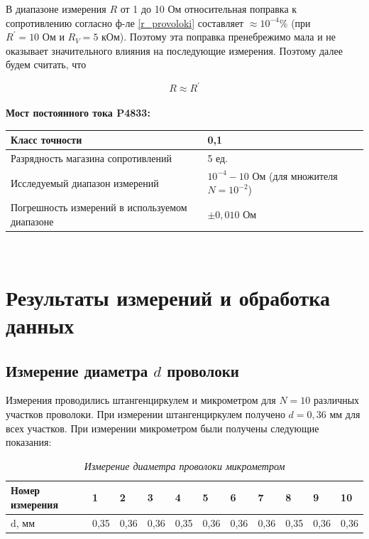\documentclass[a4paper,12pt]{article} %
\begin{document}
В диапазоне измерения $R$ от 1 до 10 Ом относительная поправка 
к сопротивлению согласно ф-ле \eqref{r_provoloki} составляет $\approx 10^{-4} \% $ (при $ R^\prime=10 \text{ Ом} $ и $ R_V = 5 \text{ кОм} $). Поэтому эта поправка пренебрежимо мала и не оказывает значительного влияния на последующие измерения. Поэтому далее будем считать, что

\begin{equation}
R\approx R^\prime
\end{equation}\\

\noindent\textbf{Мост постоянного тока P4833:}\\
\begin{tabular}{|p{8cm}|p{7cm}|}
	\hline
	Класс точности&0,1 \\
	\hline
	Разрядность магазина сопротивлений& 5 ед. \\
	\hline
	Исследуемый диапазон измерений& $ 10^{-4} - 10 \text{ Ом} $ (для множителя $ N = 10^{-2} $) \\
	\hline
	Погрешность измерений в используемом диапазоне& $\pm0,010\text{ Ом}$ \\
	\hline
\end{tabular}\\

\section{Результаты измерений и обработка данных}

\subsection{Измерение диаметра $d$ проволоки}

Измерения проводились штангенциркулем и микрометром для $N = 10$ различных участков проволоки. При измерении штангенциркулем получено $d = 0,36$ мм для всех участков. При измерении микрометром были получены следующие показания:

\begin{table}[h]
	\begin{tabular}{|l|l|l|l|l|l|l|l|l|l|l|}
		\hline
		Номер   измерения & 1    & 2    & 3    & 4    & 5    & 6    & 7    & 8    & 9    & 10   \\ \hline
		d, мм             & 0,35 & 0,36 & 0,36 & 0,35 & 0,36 & 0,36 & 0,36 & 0,35 & 0,36 & 0,36 \\ \hline
	\end{tabular}\caption{\textit{Измерение диаметра проволоки микрометром}}
\end{table}
\end{document}
